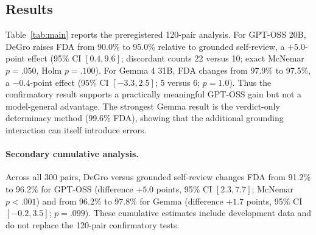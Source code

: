 \documentclass[sigconf,anonymous]{aamas}
\begin{document}
\subsection{Results}
Table~\ref{tab:main} reports the preregistered 120-pair analysis.  For GPT-OSS 20B, DeGro raises FDA from 90.0\% to 95.0\% relative to grounded self-review, a $+5.0$-point effect (95\% CI $[0.4,9.6]$; discordant counts 22 versus 10; exact McNemar $p=.050$, Holm $p=.100$).  For Gemma 4 31B, FDA changes from 97.9\% to 97.5\%, a $-0.4$-point effect (95\% CI $[-3.3,2.5]$; 5 versus 6; $p=1.0$).  Thus the confirmatory result supports a practically meaningful GPT-OSS gain but not a model-general advantage.  The strongest Gemma result is the verdict-only determinacy method (99.6\% FDA), showing that the additional grounding interaction can itself introduce errors.

\begin{table}[t]
\centering
\caption{Confirmatory results on 120 preregistered pairs per model.  UR is unsupported additions divided by all proposed additions.}
\label{tab:main}
\end{table}

\paragraph{Secondary cumulative analysis.} Across all 300 pairs, DeGro versus grounded self-review changes FDA from 91.2\% to 96.2\% for GPT-OSS (difference $+5.0$ points, 95\% CI $[2.3,7.7]$; McNemar $p<.001$) and from 96.2\% to 97.8\% for Gemma (difference $+1.7$ points, 95\% CI $[-0.2,3.5]$; $p=.099$).  These cumulative estimates include development data and do not replace the 120-pair confirmatory tests.
\end{document}
